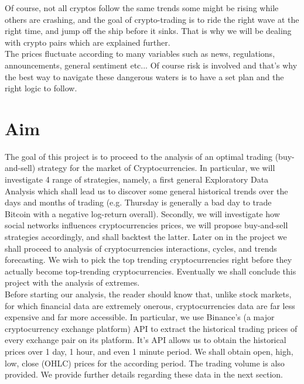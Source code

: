 \documentclass[twoside]{report}
\begin{document}
\begin{spacing}{1}
Of course, not all cryptos follow the same trends some might be rising while others are crashing, and the goal of crypto-trading is to ride the right wave at the right time, and jump off the ship before it sinks. That is why we will be dealing with crypto pairs which are explained further.\\
The prices fluctuate according to many variables such as news, regulations, announcements, general sentiment etc... Of course risk is involved and that's why the best way to navigate these dangerous waters is to have a set plan and the right logic to follow.







\section{Aim}

The goal of this project is to proceed to the analysis of an optimal trading (buy-and-sell) strategy for the market of Cryptocurrencies. In particular, we will investigate 4 range of strategies, namely, a first general Exploratory Data Analysis which shall lead us to discover some general historical trends over the days and months of trading (e.g. Thursday is generally a bad day to trade Bitcoin with a negative log-return overall). Secondly, we will investigate how social networks influences cryptocurrencies prices, we will propose buy-and-sell strategies accordingly, and shall backtest the latter. Later on in the project we shall proceed to analysis of cryptocurrencies interactions, cycles, and trends forecasting. We wish to pick the top trending cryptocurrencies right before they actually become top-trending cryptocurrencies. Eventually we shall conclude this project with the analysis of extremes. \\


Before starting our analysis, the reader should know that, unlike stock markets, for which financial data are extremely onerous, cryptocurrencies data are far less expensive and far more accessible. In particular, we use Binance's (a major cryptocurrency exchange platform) API to extract the historical trading prices of every exchange pair on its platform. It's API allows us to obtain the historical prices over 1 day, 1 hour, and even 1 minute period. We shall obtain open, high, low, close (OHLC) prices for the according period. The trading volume is also provided. We provide further details regarding these data in the next section.\\




\end{spacing}
\end{document}
